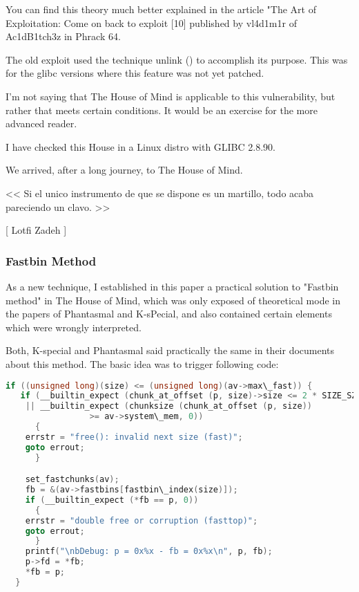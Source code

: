 \documentclass[12pt]{article}
\begin{document}
You can find this theory much better explained in the article "The Art of
Exploitation: Come on back to exploit [10] published by vl4d1m1r of
Ac1dB1tch3z in Phrack 64.
\newline

The old exploit used the technique unlink () to accomplish its purpose.
This was for the glibc versions where this feature was not yet patched.
\newline

I'm not saying that The House of Mind is applicable to this vulnerability,
but rather that meets certain conditions. It would be an exercise for the
more advanced reader.
\newline

I have checked this House in a Linux distro with GLIBC 2.8.90.
\newline

We arrived, after a long journey, to The House of Mind.
\newline


\begin{verbnobox}[\small]
                  << Si el unico instrumento de que se
                     dispone es un martillo, todo acaba
                     pareciendo un clavo. >>

                                        [ Lotfi Zadeh ]
\end{verbnobox}

\subsubsection{Fastbin Method}

As a new technique, I established in this paper a practical solution to
"Fastbin method" in The House of Mind, which was only exposed of
theoretical mode in the papers of Phantasmal and K-sPecial, and also
contained certain elements which were wrongly interpreted.
\newline

Both, K-special and Phantasmal said practically the same in their
documents about this method. The basic idea was to trigger following code:


\begin{lstlisting}[language=C]
  if ((unsigned long)(size) <= (unsigned long)(av->max\_fast)) {
   if (__builtin_expect (chunk_at_offset (p, size)->size <= 2 * SIZE_SZ, 0)
	|| __builtin_expect (chunksize (chunk_at_offset (p, size))
			     >= av->system\_mem, 0))
      {
	errstr = "free(): invalid next size (fast)";
	goto errout;
      }

    set_fastchunks(av);
    fb = &(av->fastbins[fastbin\_index(size)]);
    if (__builtin_expect (*fb == p, 0))
      {
	errstr = "double free or corruption (fasttop)";
	goto errout;
      }
    printf("\nbDebug: p = 0x%x - fb = 0x%x\n", p, fb);
    p->fd = *fb;
    *fb = p;
  }
\end{lstlisting}
\end{document}
